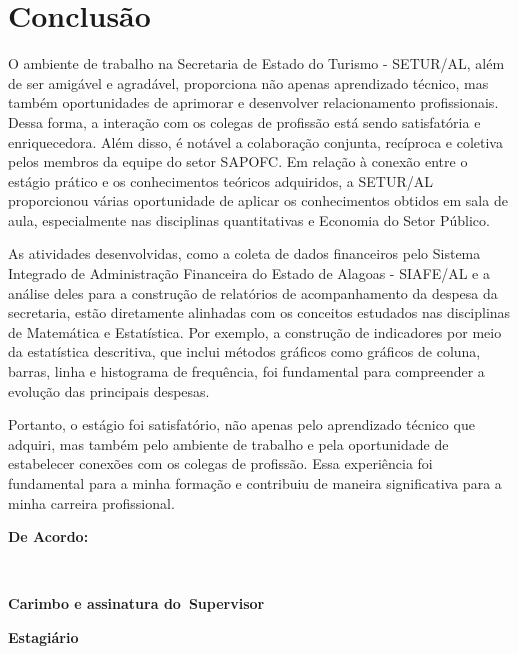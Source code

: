 \documentclass[12pt,a4paper]{article}
\begin{document}
	\section{Conclusão}
	\hspace*{1,5cm} 
	O ambiente de trabalho na Secretaria de Estado do Turismo - SETUR/AL, além de ser amigável e agradável, proporciona não apenas aprendizado técnico, mas também oportunidades de aprimorar e desenvolver relacionamento profissionais. Dessa forma, a interação com os colegas de profissão está sendo satisfatória e enriquecedora. Além disso, é notável a colaboração conjunta, recíproca e coletiva pelos membros da equipe do setor SAPOFC. Em relação à conexão entre o estágio prático e os conhecimentos teóricos adquiridos, a SETUR/AL proporcionou várias oportunidade de aplicar os conhecimentos obtidos em sala de aula, especialmente nas disciplinas quantitativas e  Economia do Setor Público. 
	
	As atividades desenvolvidas, como a coleta de dados financeiros pelo Sistema Integrado de Administração Financeira do Estado de Alagoas - SIAFE/AL e a análise deles para a construção de relatórios de acompanhamento da despesa da secretaria, estão diretamente alinhadas com os conceitos estudados nas disciplinas de Matemática e Estatística. Por exemplo, a construção de indicadores por meio da estatística descritiva, que inclui métodos gráficos como gráficos de coluna, barras, linha e histograma de frequência, foi fundamental para compreender a evolução das principais despesas. 
	
	Portanto, o estágio foi satisfatório, não apenas pelo aprendizado técnico que adquiri, mas também pelo ambiente de trabalho e pela oportunidade de estabelecer conexões com os colegas de profissão. Essa experiência foi fundamental para a minha formação e contribuiu de maneira significativa para a minha carreira profissional.

	

	
	\newpage
	\vspace{2cm}
	\noindent \textbf{De Acordo:}
	
	\vfill

	\noindent
	\underline{\hspace{7cm}} \hfill \underline{\hspace{7cm}} \\[0.3cm]

	\begin{minipage}[t]{7cm}
		\centering
		\textbf{Carimbo e assinatura do\
		Supervisor}
	\end{minipage}
		\hfill
	\begin{minipage}[t]{7cm}
		\centering
		\textbf{Estagiário}
	\end{minipage}

	
\end{document}
